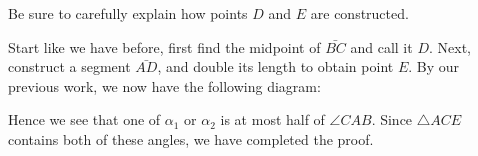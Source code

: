 \documentclass{ximera}
\begin{document}
\begin{question}
\begin{solution}
\begin{hint}
\begin{image}
\end{image}
Be sure to carefully explain how points $D$ and $E$ are constructed.
\end{hint}
\begin{freeResponse}
Start like we have before, first find the midpoint of $\bar{BC}$ and
call it $D$. Next, construct a segment $\bar{AD}$, and double its
length to obtain point $E$. By our previous work, we now have the
following diagram:
\begin{image}
\end{image}
Hence we see that one of $\alpha_1$ or $\alpha_2$ is at most half of
$\angle CAB$. Since $\triangle ACE$ contains both of these angles, we
have completed the proof.
\end{freeResponse}
\end{solution}
\end{question}

\end{document}
